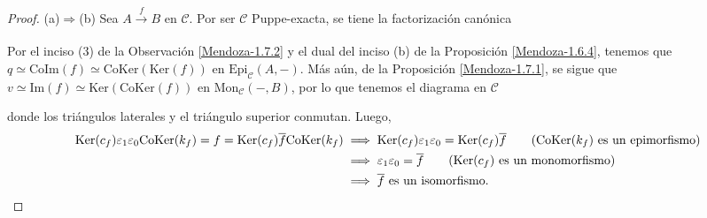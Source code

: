 \documentclass[tesis]{subfiles}
\begin{document}
\begin{proof}\leavevmode

    (a)$\Rightarrow$(b) Sea $A\xrightarrow[]{f}B$ en $\mathscr{C}$. Por ser $\mathscr{C}$ Puppe-exacta, se tiene la factorización canónica
    \begin{center}
    \end{center}
    Por el inciso (3) de la Observación \ref{Mendoza-1.7.2} y el dual del inciso (b) de la Proposición \ref{Mendoza-1.6.4}, tenemos que $q\simeq \text{CoIm}(f) \simeq \text{CoKer}(\text{Ker}(f))$ en $\text{Epi}_\mathscr{C}(A,-)$. Más aún, de la Proposición \ref{Mendoza-1.7.1}, se sigue que $v\simeq \text{Im}(f) \simeq \text{Ker}(\text{CoKer}(f))$ en $\text{Mon}_\mathscr{C}(-,B)$, por lo que tenemos el diagrama en $\mathscr{C}$
    \begin{center}
    \end{center}
    donde los triángulos laterales y el triángulo superior conmutan. Luego,
    \begin{align*}
        \text{Ker}(c_f)\varepsilon_1\varepsilon_0\text{CoKer}(k_f) = f = \text{Ker}(c_f)\overline{f}\text{CoKer}(k_f) &\implies \text{Ker}(c_f)\varepsilon_1\varepsilon_0 = \text{Ker}(c_f)\overline{f} \tag{$\text{CoKer}(k_f)$ es un epimorfismo} \\
                                                                                                                      &\implies \varepsilon_1\varepsilon_0 = \overline{f} \tag{$\text{Ker}(c_f)$ es un monomorfismo} \\
                                                                                                                      &\implies \overline{f} \text{ es un isomorfismo}.
    \end{align*}


\end{proof}
\end{document}
